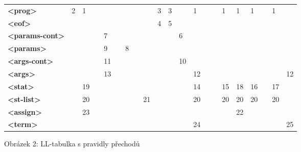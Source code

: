 \documentclass[11pt,a4paper]{article}
\renewcommand{\familydefault}{\sfdefault}
\begin{document}
\begin{table}[H]
{\begin{tabular}{|l|l|l|l|l|l|l|l|l|l|l|l|l|l|l|l|l|l|l|l|l|}
			& \textbf{\begin{sideways}val\end{sideways}} \\ \hline
			\textbf{\textless{}prog\textgreater{}}        & 2 & 1  &   &    &   &   &   &    & 3 & 3                                      &    & 1  &   &   & 1  & 1  & 1  &   & 1  &                                       \\ \hline
			\textbf{\textless{}eof\textgreater{}}         &   &    &   &    &   &   &   &    & 4 & 5                                      &    &    &   &   &    &    &    &   &    &                                       \\ \hline
			\textbf{\textless{}params-cont\textgreater{}} &   &    &   & 7  &   &   &   &    &   &                                        & 6  &    &   &   &    &    &    &   &    &                                       \\ \hline
			\textbf{\textless{}params\textgreater{} }     &   &    &   & 9  &   & 8 &   &    &   &                                        &    &    &   &   &    &    &    &   &    &                                       \\ \hline
			\textbf{\textless{}args-cont\textgreater{}}   &   &    &   & 11 &   &   &   &    &   &                                        & 10 &    &   &   &    &    &    &   &    &                                       \\ \hline
			\textbf{\textless{}args\textgreater{} }       &   &    &   & 13 &   &   &   &    &   &                                        &    & 12 &   &   &    &    &    &   &    & 12                                    \\ \hline
			\textbf{\textless{}stat\textgreater{}  }      &   & 19 &   &    &   &   &   &    &   &                                        &    & 14 &   &   & 15 & 18 & 16 &   & 17 &                                       \\ \hline
			\textbf{\textless{}st-list\textgreater{}   }  &   & 20 &   &    &   &   &   & 21 &   &                                        &    & 20 &   &   & 20 & 20 & 20 &   & 20 &                                       \\ \hline
			\textbf{\textless{}assign\textgreater{}   }   &   & 23 &   &    &   &   &   &    &   &                                        &    &    &   &   &    & 22 &    &   &    &                                       \\ \hline
			\textbf{\textless{}term\textgreater{}    }    &   &    &   &    &   &   &   &    &   &                                        &    & 24 &   &   &    &    &    &   &    & 25                                    \\ \hline
		\end{tabular}}
	\renewcommand{\familydefault}{\sfdefault}
\end{table}
\renewcommand{\familydefault}{\sfdefault}
\begin{center}
	\caption{Obrázek 2: LL-tabulka s pravidly přechodů}
\end{center}
\end{document}
